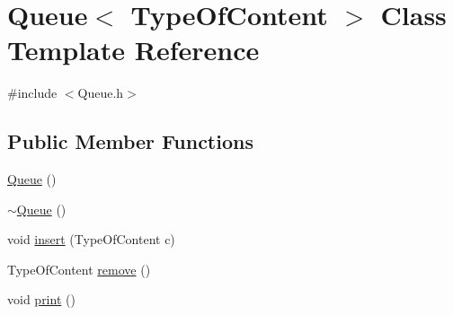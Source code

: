 \hypertarget{classQueue}{\section{Queue$<$ Type\+Of\+Content $>$ Class Template Reference}
\label{classQueue}
}


{\ttfamily \#include $<$Queue.\+h$>$}

\subsection*{Public Member Functions}
\begin{DoxyCompactItemize}
\item 
\hyperlink{classQueue_a4330d73db1c24e73176c59abfdaf61dd}{Queue} ()
\item 
\hyperlink{classQueue_a9921f306e120436c79c342b76f014b07}{$\sim$\+Queue} ()
\item 
void \hyperlink{classQueue_aad2963921777978c979e181e73ee4715}{insert} (Type\+Of\+Content c)
\item 
Type\+Of\+Content \hyperlink{classQueue_a2a9f7eb23107f724ffe894bd96ec4add}{remove} ()
\item 
void \hyperlink{classQueue_a2042a7f8fa12a5bc7042ed493f401c72}{print} ()
\end{DoxyCompactItemize}
